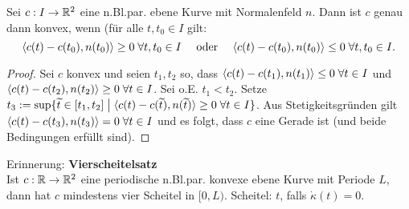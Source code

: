 \documentclass[11pt]{scrbook}
\begin{document}
\begin{lem}
Sei $c: I  \to \mathbb{R}^2$ eine n.Bl.par. ebene Kurve mit Normalenfeld $n$. Dann ist $c$ genau dann konvex, wenn (für alle $t, t_0 \in I$ gilt:
\[ \langle c(t) - c(t_0), n(t_0) \rangle \geq 0 \; \forall t, t_0 \in I \quad \text{ oder } \quad \langle c(t) - c(t_0) , n(t_0) \rangle \leq 0 \; \forall t, t_0 \in I. \]
\begin{proof}
Sei $c$ konvex und seien $t_1, t_2$ so, dass $\langle c(t) - c(t_1), n(t_1) \rangle \leq 0 \; \forall t \in I$ und $\langle c(t) - c(t_2), n(t_2) \rangle \geq 0 \; \forall t \in I$. Sei o.E. $t_1 < t_2$. Setze $t_3 := \sup \{\widetilde t \in [t_1, t_2] \; \big| \; \langle c(t) - c(\widetilde t), n(\widetilde t) \rangle \geq 0 \; \forall t \in I \}$. Aus Stetigkeitsgründen gilt $\langle c(t) - c(t_3), n(t_3) \rangle = 0 \; \forall t \in I$ und es folgt, dass $c$ eine Gerade ist (und beide Bedingungen erfüllt sind).
\end{proof}
\end{lem}



\newpage
\setcounter{thm}{7}
Erinnerung: \textbf{Vierscheitelsatz} \\
Ist $c: \mathbb{R} \to \mathbb{R}^2$ eine periodische n.Bl.par. konvexe ebene Kurve mit Periode $L$, dann hat $c$ mindestens vier Scheitel in $[0, L)$. Scheitel: $t$, falls $\dot \kappa(t) = 0$.
\end{document}
